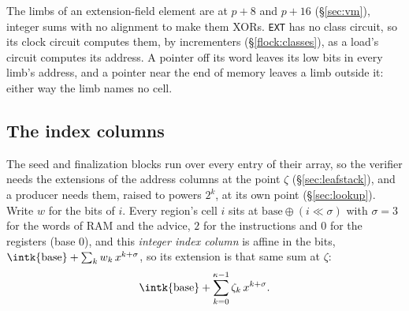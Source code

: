 The limbs of an extension-field element are at $p+8$ and $p+16$ (\S\ref{sec:vm}), integer sums with no alignment to make them XORs. \texttt{EXT} has no class circuit, so its clock circuit computes them, by incrementers (\S\ref{flock:classes}), as a load's circuit computes its address. A pointer off its word leaves its low bits in every limb's address, and a pointer near the end of memory leaves a limb outside it: either way the limb names no cell.

\subsection{The index columns}\label{sec:idxcol}

The seed and finalization blocks run over every entry of their array, so the verifier needs the extensions of the address columns at the point $\zeta$ (\S\ref{sec:leafstack}), and a producer needs them, raised to powers $2^{k}$, at its own point (\S\ref{sec:lookup}). Write $w$ for the bits of $i$. Every region's cell $i$ sits at $\mathrm{base}\oplus(i\ll\sigma)$ with $\sigma=3$ for the words of RAM and the advice, $2$ for the instructions and $0$ for the registers (base $0$), and this \emph{integer index column} is affine in the bits, $\intk{\mathrm{base}}+\sum_k w_k\,x^{k+\sigma}$, so its extension is that same sum at $\zeta$:
\[
  \intk{\mathrm{base}}+\sum_{k=0}^{\kappa-1}\zeta_k\,x^{k+\sigma}.
\]
